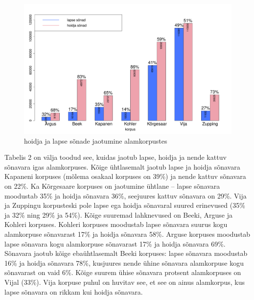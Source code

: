 \documentclass[12pt]{article}
\begin{document}
\begin{figure}[H]
    \centering
    \includegraphics[width=\textwidth]{koik_korpus_sonad}
    \caption{hoidja ja lapse sõnade jaotumine alamkorpustes}
\end{figure}

Tabelis 2 on välja toodud see, kuidas jaotub lapse, hoidja ja nende kattuv sõnavara igas alamkorpuses. Kõige ühtlasemalt jaotub lapse ja hoidja sõnavara Kapaneni korpuses (mõlema osakaal korpuses on 39\%) ja nende kattuv sõnavara on 22\%. Ka Kõrgesaare korpuses on jaotumine ühtlane -- lapse sõnavara moodustab 35\% ja hoidja sõnavara 36\%, seejuures kattuv sõnavara on 29\%. Vija ja Zuppingu korpusteski pole lapse ega hoidja sõnavaral suured erinevused (35\% ja 32\% ning 29\% ja 54\%). Kõige suuremad lahknevused on Beeki, Arguse ja Kohleri korpuses. Kohleri korpuses moodustab lapse sõnavara suurus kogu alamkorpuse sõnavarast 17\% ja hoidja sõnavara 58\%. Arguse korpuses moodustab lapse sõnavara kogu alamkorpuse sõnavarast 17\% ja hoidja sõnavara 69\%. Sõnavara jaotub kõige ebaühtlasemalt Beeki korpuses: lapse sõnavara moodustab 16\% ja hoidja sõnavara 78\%, kusjuures nende ühine sõnavara alamkorpuse kogu sõnavarast on vaid 6\%. Kõige suurem ühise sõnavara protsent alamkorpuses on Vijal (33\%). Vija korpuse puhul on huvitav see, et see on ainus alamkorpus, kus lapse sõnavara on rikkam kui hoidja sõnavara.
\end{document}
